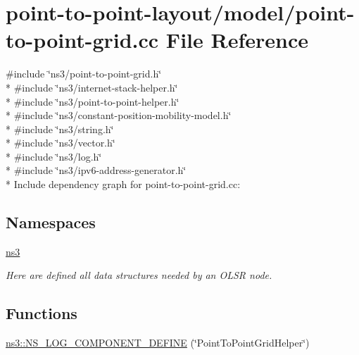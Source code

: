\hypertarget{point-to-point-grid_8cc}{}\section{point-\/to-\/point-\/layout/model/point-\/to-\/point-\/grid.cc File Reference}
\label{point-to-point-grid_8cc}
{\ttfamily \#include \char`\"{}ns3/point-\/to-\/point-\/grid.\+h\char`\"{}}\\*
{\ttfamily \#include \char`\"{}ns3/internet-\/stack-\/helper.\+h\char`\"{}}\\*
{\ttfamily \#include \char`\"{}ns3/point-\/to-\/point-\/helper.\+h\char`\"{}}\\*
{\ttfamily \#include \char`\"{}ns3/constant-\/position-\/mobility-\/model.\+h\char`\"{}}\\*
{\ttfamily \#include \char`\"{}ns3/string.\+h\char`\"{}}\\*
{\ttfamily \#include \char`\"{}ns3/vector.\+h\char`\"{}}\\*
{\ttfamily \#include \char`\"{}ns3/log.\+h\char`\"{}}\\*
{\ttfamily \#include \char`\"{}ns3/ipv6-\/address-\/generator.\+h\char`\"{}}\\*
Include dependency graph for point-\/to-\/point-\/grid.cc\+:
\subsection*{Namespaces}
\begin{DoxyCompactItemize}
\item 
 \hyperlink{namespacens3}{ns3}
\begin{DoxyCompactList}\small\item\em Here are defined all data structures needed by an O\+L\+SR node. \end{DoxyCompactList}\end{DoxyCompactItemize}
\subsection*{Functions}
\begin{DoxyCompactItemize}
\item 
\hyperlink{namespacens3_a20bfcbb922c1b011e68d6f4a0b286a67}{ns3\+::\+N\+S\+\_\+\+L\+O\+G\+\_\+\+C\+O\+M\+P\+O\+N\+E\+N\+T\+\_\+\+D\+E\+F\+I\+NE} (\char`\"{}Point\+To\+Point\+Grid\+Helper\char`\"{})
\end{DoxyCompactItemize}
